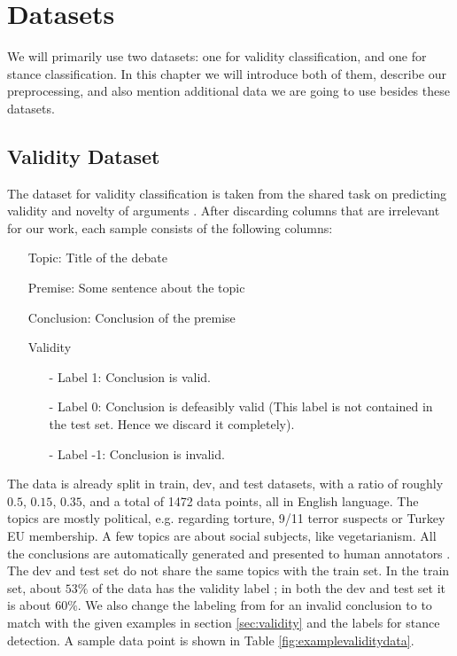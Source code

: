 \section{Datasets}

We will primarily use two datasets: one for validity classification, and one for stance classification. In this chapter we will introduce both of them, describe our preprocessing, and also mention additional data we are going to use besides these datasets.

\subsection{Validity Dataset} \label{sec:validitydata}

The dataset for validity classification is taken from the shared task on predicting validity and novelty of arguments \cite{argsvalidnovel2022}. After discarding columns that are irrelevant for our work, each sample consists of the following columns:
\begin{enumerate}
	\item[\textbullet] Topic: Title of the debate
	\item[\textbullet] Premise: Some sentence about the topic
	\item[\textbullet] Conclusion: Conclusion of the premise
	\item[\textbullet] Validity
	\begin{enumerate}
		\item[-] Label 1: Conclusion is valid.
		\item[-] Label 0: Conclusion is defeasibly valid (This label is not contained in the test set. Hence we discard it completely).
		\item[-] Label -1: Conclusion is invalid.
	\end{enumerate}
\end{enumerate}
The data is already split in train, dev, and test datasets, with a ratio of roughly $0.5$, $0.15$, $0.35$, and a total of \num[group-separator={,}]{1472} data points, all in English language. The topics are mostly political, e.g. regarding torture, 9/11 terror suspects or Turkey EU membership. A few topics are about social subjects, like vegetarianism. All the conclusions are automatically generated and presented to human annotators \cite{argsvalidnovel2022}. The dev and test set do not share the same topics with the train set. In the train set, about $53\%$ of the data has the validity label ; in both the dev and test set it is about $60\%$. We also change the labeling from  for an invalid conclusion to  to match with the given examples in section \ref{sec:validity} and the labels for stance detection. A sample data point is shown in Table \ref{fig:examplevaliditydata}.


